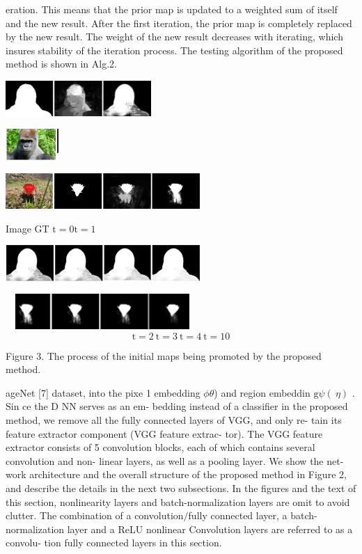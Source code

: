 \documentclass[a4paper,10pt]{article}
\begin{document}
eration. This means that the prior map is updated to a weighted sum of itself and the new result. After the first iteration, the prior map is completely replaced by the new result. The weight of the new result decreases with iterating, which insures stability of the iteration process. The testing algorithm of the proposed method is shown in Alg.2.
\begin{center}
\includegraphics[width=55.29mm,height=13.46mm]{./zengyu_images/image004.eps}

\includegraphics[width=20.24mm,height=11.85mm]{./zengyu_images/image005.eps}

\includegraphics[width=73.83mm,height=13.55mm]{./zengyu_images/image006.eps}
\end{center}
Image GT $\mathrm{t}=0 \mathrm{t}=1$
\begin{center}
\includegraphics[width=74.17mm,height=13.63mm]{./zengyu_images/image007.eps}

\includegraphics[width=73.53mm,height=13.42mm]{./zengyu_images/image008.eps}
$$
\mathrm{t}=2\ \mathrm{t}=3\ \mathrm{t}=4\ \mathrm{t}=10
$$
\end{center}
Figure 3. The process of the initial maps being promoted by the proposed method.

ageNet [7] dataset, into the pixe 1 embedding $\phi \theta$) and region embeddin $\mathrm{g}\psi (\ \eta)$ . Sin ce the D NN serves as an em- bedding instead of a classifier in the proposed method, we remove all the fully connected layers of VGG, and only re- tain its feature extractor component (VGG feature extrac- tor). The VGG feature extractor consists of 5 convolution blocks, each of which contains several convolution and non- linear layers, as well as a pooling layer. We show the net- work architecture and the overall structure of the proposed method in Figure 2, and describe the details in the next two subsections. In the figures and the text of this section, nonlinearity layers and batch-normalization layers are omit to avoid clutter. The combination of a convolution$/$fully connected layer, a batch-normalization layer and a ReLU nonlinear Convolution layers are referred to as a convolu- tion fully connected layers in this section.
\end{document}
